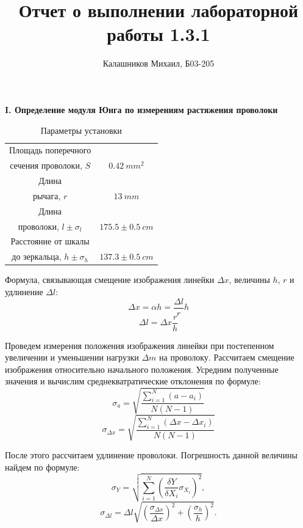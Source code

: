 \documentclass[14pt, a4paper]{article}
\title{\textbf{Отчет о выполнении лабораторной работы 1.3.1}}
\author{Калашников Михаил, Б03-205}
\date{}
\begin{document}
\maketitle

\centerline{\textbf{I. Определение модуля Юнга по измерениям растяжения проволоки}}

\begin{table}[!h]
\centering
\begin{tabular}{| c | c |}
\hline
Площадь поперечного & \\
сечения проволоки, $S$ & $0.42\ mm^2$ \\
Длина & \\
рычага, $r$ & $13\ mm$ \\
Длина & \\
проволоки, $l\pm\sigma_l$ & $175.5\pm 0.5\ cm$ \\
Расстояние от шкалы & \\
до зеркальца, $h\pm\sigma_h$ & $137.3\pm 0.5\ cm$ \\
\hline

\end{tabular}
\label{table1}
\caption{Параметры установки}
\end{table}

Формула, связывающая смещение изображения линейки $\Delta x$, величины $h$, $r$ и удлинение $\Delta l$:
\[\Delta x=\alpha h=\frac{\Delta l}{r}h\]
\[\Delta l=\Delta x\frac{r}{h}\]

Проведем измерения положения изображения линейки при постепенном увеличении и уменьшении нагрузки $\Delta m$ на проволоку. Рассчитаем смещение изображения относительно начального положения. Усредним полученные значения и вычислим среднекватратические отклонения по формуле:
\[\sigma_a=\sqrt{\frac{\sum_{i=1}^{N}\left(a-a_{i}\right)}{N\left(N-1\right)}}\]
\[\sigma_{\Delta x}=\sqrt{\frac{\sum_{i=1}^{N}\left(\Delta x-\Delta x_{i}\right)}{N\left(N-1\right)}}\]

После этого рассчитаем удлинение проволоки. Погрешность данной величины найдем по формуле:
\[\sigma_Y=\sqrt{\sum_{i=1}^N\left(\frac{\delta Y}{\delta X_i}\sigma_{X_i}\right)^2},\]
\[\sigma_{\Delta l}=\Delta l\sqrt{\left(\frac{\sigma_{\Delta x}}{\Delta x}\right)^{2}+\left(\frac{\sigma_{h}}{h}\right)^{2}}.\]

\newpage
\end{document}
